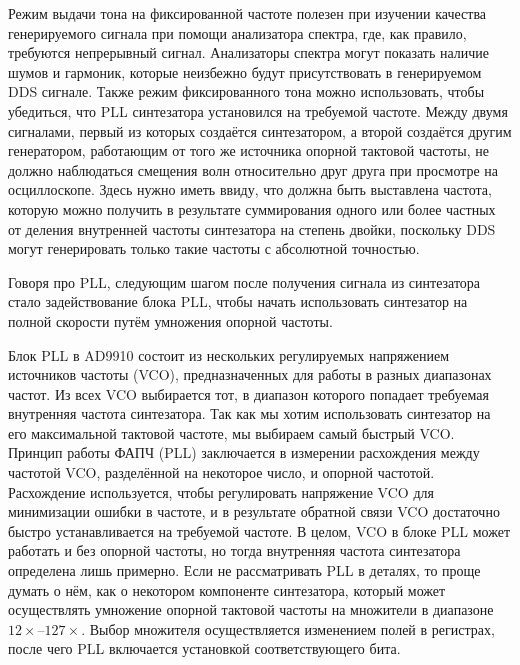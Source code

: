 \documentclass[rusmathsym, eqnumwithinsec, amspack, hyperref]{bomgost}
\begin{document}
Режим выдачи тона на фиксированной частоте полезен при изучении качества генерируемого сигнала при помощи анализатора спектра, где, как правило, требуются непрерывный сигнал. Анализаторы спектра могут показать наличие шумов и гармоник, которые неизбежно будут присутствовать в генерируемом DDS сигнале. Также режим фиксированного тона можно использовать, чтобы убедиться, что PLL синтезатора установился на требуемой частоте. Между двумя сигналами, первый из которых создаётся синтезатором, а второй создаётся другим генератором, работающим от того же источника опорной тактовой частоты, не должно наблюдаться смещения волн относительно друг друга при просмотре на осциллоскопе. Здесь нужно иметь ввиду, что должна быть выставлена частота, которую можно получить в результате суммирования одного или более частных от деления внутренней частоты синтезатора на степень двойки, поскольку DDS могут генерировать только такие частоты с абсолютной точностью.

Говоря про PLL, следующим шагом после получения сигнала из синтезатора стало задействование блока PLL, чтобы начать использовать синтезатор на полной скорости путём умножения опорной частоты.

Блок PLL в AD9910 состоит из нескольких регулируемых напряжением источников частоты (VCO), предназначенных для работы в разных диапазонах частот. Из всех VCO выбирается тот, в диапазон которого попадает требуемая внутренняя частота синтезатора. Так как мы хотим использовать синтезатор на его максимальной тактовой частоте, мы выбираем самый быстрый VCO. Принцип работы ФАПЧ (PLL) заключается в измерении расхождения между частотой VCO, разделённой на некоторое число, и опорной частотой. Расхождение используется, чтобы регулировать напряжение VCO для минимизации ошибки в частоте, и в результате обратной связи VCO достаточно быстро устанавливается на требуемой частоте. В целом, VCO в блоке PLL может работать и без опорной частоты, но тогда внутренняя частота синтезатора определена лишь примерно. Если не рассматривать PLL в деталях, то проще думать о нём, как о некотором компоненте синтезатора, который может осуществлять умножение опорной тактовой частоты на множители в диапазоне $12\times$--$127\times$. Выбор множителя осуществляется изменением полей в регистрах, после чего PLL включается установкой соответствующего бита.
\end{document}
